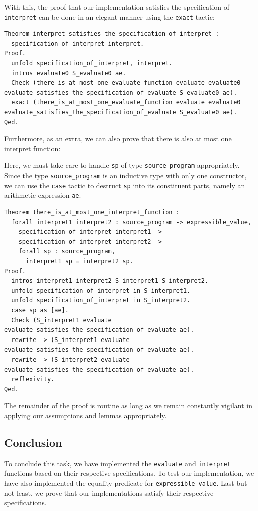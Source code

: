 \documentclass{article}
\begin{document}
With this, the proof that our implementation satisfies the specification of \texttt{interpret} can be done in an elegant manner using the \texttt{exact} tactic:

\begin{lstlisting}
Theorem interpret_satisfies_the_specification_of_interpret :
  specification_of_interpret interpret.
Proof.
  unfold specification_of_interpret, interpret.
  intros evaluate0 S_evaluate0 ae.
  Check (there_is_at_most_one_evaluate_function evaluate evaluate0 evaluate_satisfies_the_specification_of_evaluate S_evaluate0 ae).
  exact (there_is_at_most_one_evaluate_function evaluate evaluate0 evaluate_satisfies_the_specification_of_evaluate S_evaluate0 ae).
Qed.
\end{lstlisting}

Furthermore, as an extra, we can also prove that there is also at most one interpret function:

Here, we must take care to handle \texttt{sp} of type \texttt{source\_program} appropriately. Since the type \texttt{source\_program} is an inductive type with only one constructor, we can use the \texttt{case} tactic to destruct \texttt{sp} into its constituent parts, namely an arithmetic expression \texttt{ae}.

\begin{lstlisting}
Theorem there_is_at_most_one_interpret_function :
  forall interpret1 interpret2 : source_program -> expressible_value,
    specification_of_interpret interpret1 ->
    specification_of_interpret interpret2 ->
    forall sp : source_program,
      interpret1 sp = interpret2 sp.
Proof.
  intros interpret1 interpret2 S_interpret1 S_interpret2.
  unfold specification_of_interpret in S_interpret1.
  unfold specification_of_interpret in S_interpret2.
  case sp as [ae].
  Check (S_interpret1 evaluate evaluate_satisfies_the_specification_of_evaluate ae).
  rewrite -> (S_interpret1 evaluate evaluate_satisfies_the_specification_of_evaluate ae).
  rewrite -> (S_interpret2 evaluate evaluate_satisfies_the_specification_of_evaluate ae).
  reflexivity.
Qed.
\end{lstlisting}

The remainder of the proof is routine as long as we remain constantly vigilant in applying our assumptions and lemmas appropriately.
    
\subsection{Conclusion}
To conclude this task, we have implemented the \texttt{evaluate} and \texttt{interpret} functions based on their respective specifications. To test our implementation, we have also implemented the equality predicate for \texttt{expressible\_value}. Last but not least, we prove that our implementations satisfy their respective specifications.
\end{document}
